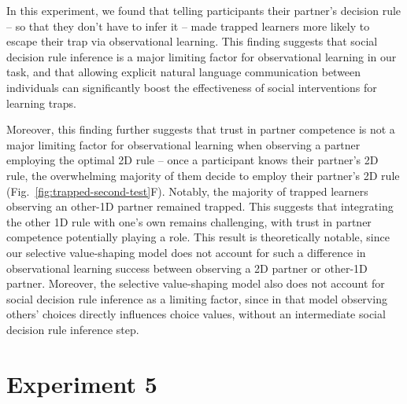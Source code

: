 \documentclass[11pt]{article} %
\begin{document}
In this experiment, we found that telling participants their partner's decision rule -- so that they don't have to infer it -- made trapped learners more likely to escape their trap via observational learning. This finding suggests that social decision rule inference is a major limiting factor for observational learning in our task, and that allowing explicit natural language communication between individuals can significantly boost the effectiveness of social interventions for learning traps.

Moreover, this finding further suggests that trust in partner competence is not a major limiting factor for observational learning when observing a partner employing the optimal 2D rule -- once a participant knows their partner's 2D rule, the overwhelming majority of them decide to employ their partner's 2D rule (Fig.~\ref{fig:trapped-second-test}F). Notably, the majority of trapped learners observing an other-1D partner remained trapped. This suggests that integrating the other 1D rule with one's own remains challenging, with trust in partner competence potentially playing a role. This result is theoretically notable, since our selective value-shaping model does not account for such a difference in observational learning success between observing a 2D partner or other-1D partner. Moreover, the selective value-shaping model also does not account for social decision rule inference as a limiting factor, since in that model observing others' choices directly influences choice values, without an intermediate social decision rule inference step. 

\section{Experiment 5}
\end{document}
